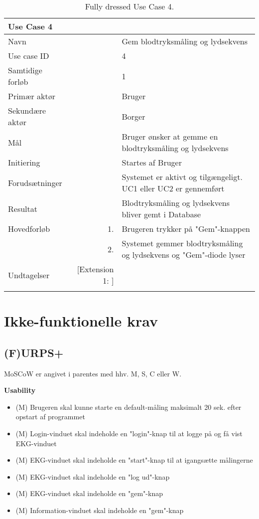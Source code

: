 \begin{longtabu} to  %
    {\large \textbf{Use Case 4}} && \\
    \toprule
    Navn &&    Gem blodtryksmåling og lydsekvens\\
    Use case ID &&    4\\
    Samtidige forløb &&    1\\
    Primær aktør &&    Bruger\\
    Sekundære aktør &&	Borger \\
    Mål &&    Bruger ønsker at gemme en blodtryksmåling og lydsekvens\\
    Initiering &&	Startes af Bruger\\
    Forudsætninger &&  Systemet er aktivt og tilgængeligt. UC1 eller UC2 er gennemført  \\
    Resultat &&		Blodtryksmåling og lydsekvens bliver gemt i Database                   \\ \midrule
    Hovedforløb &    1. &    Brugeren trykker på "Gem"\--knappen\\[-1ex]   						 	
                &    2. &    Systemet gemmer blodtryksmåling og lydsekvens og 		 "Gem"\--diode lyser \\ 
                			 \midrule
                
    Undtagelser &   [Extension 1: ]  &      \\ \bottomrule
\caption{Fully dressed Use Case 4.}
\label{UC4}
\end{longtabu}



\section{Ikke-funktionelle krav}


\subsection{(F)URPS+}
MoSCoW er angivet i parentes med hhv. M, S, C eller W.

\textbf{Usability}
\begin{itemize}
	\item (M) Brugeren skal kunne starte en default-måling maksimalt 20 sek. efter opstart af programmet
	\item (M) Login-vinduet skal indeholde en "login"\--knap til at logge på og få vist EKG-vinduet
	\item (M) EKG-vinduet skal indeholde en "start"\--knap til at igangsætte målingerne
	\item (M) EKG-vinduet skal indeholde en "log ud"\--knap
	\item (M) EKG-vinduet  skal indeholde en "gem"\--knap
	\item (M) Information-vinduet skal indeholde en "gem"\--knap
\end{itemize}

